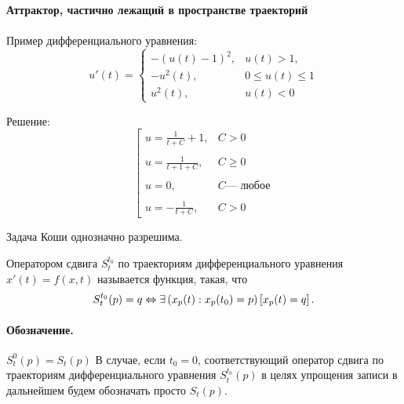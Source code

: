 

\geometry{left=1cm}%
\geometry{right=1cm}%
\geometry{top=1cm}%
\geometry{bottom=2cm}%






\paragraph{Аттрактор, частично лежащий в пространстве траекторий}
\paragraph{}
Пример дифференциального уравнения:
\begin{equation}\label{primer_iz_statyi}
	u'(t)=
	\left\{
		\begin{array}{ll}
			-(u(t)-1)^2, & u(t) > 1, \\
			-u^2 (t)   , & 0 \leq u(t) \leq 1 \\
			u^2 (t)    , & u(t) < 0
		\end{array}
	\right.
\end{equation}

Решение:
\begin{equation}\label{primer_iz_statyi_u_t}
	\left[
		\begin{array}{ll}
			u=\frac{1}{t+C}+1, & C>0
		\\\\
			u=\frac{1}{t+1+C}, & C\geq0
		\\\\
			u=0,               & C \mbox{--- любое}
		\\\\
			u=-\frac{1}{t+C},  & C>0
		\end{array}
	\right.
\end{equation}

Задача Коши однозначно разрешима.

\opred
Оператором сдвига $S^{t_0}_t$ по траекториям дифференциального уравнения $x'(t) = f(x,t)$ называется функция, такая, что
\begin{equation*}
	S^{t_0}_t (p) = q \Leftrightarrow
		\exists\left(x_p(t) : x_p(t_0) = p\right)\left[x_p(t) = q\right].
\end{equation*}

\paragraph{Обозначение.}
$S^{0}_t (p) = S_t (p)$
В случае, если $t_0=0$, соответствующий оператор сдвига по траекториям дифференциального уравнения $S^{t_0}_t (p)$ в целях упрощения записи  в дальнейшем будем обозначать просто $S_t (p)$.

